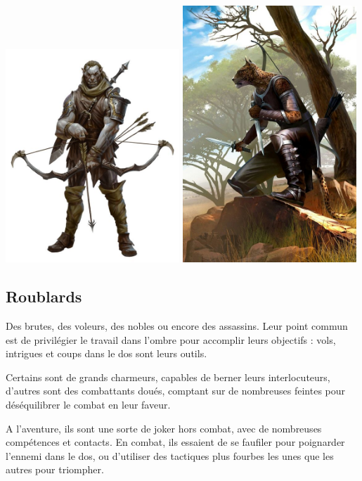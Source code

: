 \documentclass[10pt,a4paper]{book}
\begin{document}
\includegraphics[width=0.49\textwidth]{ranger 1}
\includegraphics[width=0.49\textwidth]{ranger 2}
\subsection{Roublards}
Des brutes, des voleurs, des nobles ou encore des assassins. Leur point commun est de privilégier le travail dans l'ombre pour accomplir leurs objectifs : vols, intrigues et coups dans le dos sont leurs outils.

Certains sont de grands charmeurs, capables de berner leurs interlocuteurs, d'autres sont des combattants doués, comptant sur de nombreuses feintes pour déséquilibrer le combat en leur faveur.

A l'aventure, ils sont une sorte de joker hors combat, avec de nombreuses compétences et contacts. En combat, ils essaient de se faufiler pour poignarder l'ennemi dans le dos, ou d'utiliser des tactiques plus fourbes les unes que les autres pour triompher.
\end{document}

